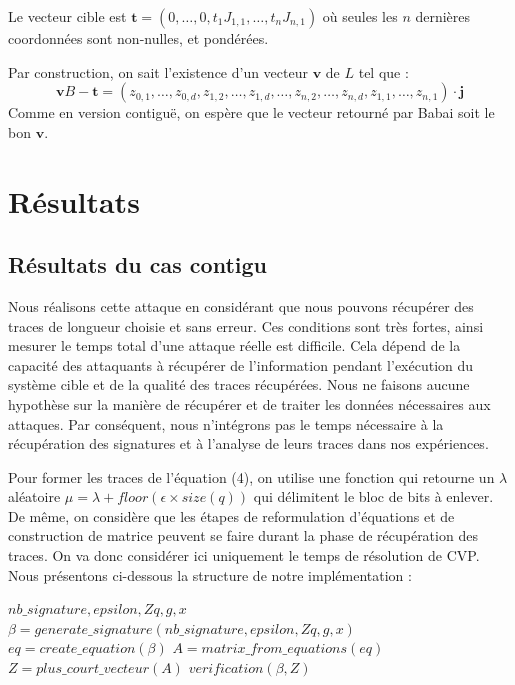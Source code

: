 \documentclass{backend}
\begin{document}
Le vecteur cible est $\mathbf{t}=\left(0, \ldots, 0, t_{1} J_{1,1}, \ldots, t_{n} J_{n, 1}\right)$ où seules les $n$ dernières coordonnées sont non-nulles, et pondérées.

Par construction, on sait l'existence d'un vecteur $\mathbf{v}$ de $L$ tel que :
$$
\mathbf{v} B-\mathbf{t}=\left(z_{0,1}, \ldots, z_{0, d}, z_{1,2}, \ldots, z_{1, d}, \ldots, z_{n, 2}, \ldots, z_{n, d}, z_{1,1}, \ldots, z_{n, 1}\right) \cdot \mathbf{j}
$$
Comme en version contiguë, on espère que le vecteur retourné par Babai soit le bon $\mathbf{v}$.



%
%


\newpage
\section{Résultats} \label{sec:résultats}

\subsection{Résultats du cas contigu}

Nous réalisons cette attaque en considérant que nous pouvons récupérer des traces de longueur choisie et sans erreur. Ces conditions sont très fortes, ainsi mesurer le temps total d'une attaque réelle est difficile. Cela dépend de la capacité des attaquants à récupérer de l'information pendant l'exécution du système cible et de la qualité des traces récupérées. Nous ne faisons aucune hypothèse sur la manière de récupérer et de traiter les données nécessaires aux attaques. Par conséquent, nous n'intégrons pas le temps nécessaire à la récupération des signatures et à l'analyse de leurs traces dans nos expériences. \smallbreak

Pour former les traces de l'équation (4), on utilise une fonction qui retourne un $\lambda$ aléatoire $\mu = \lambda + floor(\epsilon\times size(q))$ qui délimitent le bloc de bits à enlever.
De même, on considère que les étapes de reformulation d'équations et de construction de matrice peuvent se faire durant la phase de récupération des traces. On va donc considérer ici uniquement le temps de résolution de CVP. Nous présentons ci-dessous la structure de notre implémentation :

\begin{algorithm}
\caption{}
\begin{algorithmic}[1]
\Require $nb\_signature, epsilon, Zq, g, x$  
\State $\beta = generate\_signature(nb\_signature, epsilon, Zq, g, x)$
\State $eq = create\_equation(\beta)$
\State $A = matrix\_from\_equations(eq)$
\State $Z = plus\_court\_vecteur(A)$ 
\Ensure $verification(\beta,Z)$

\end{algorithmic}
\end{algorithm}
\end{document}
